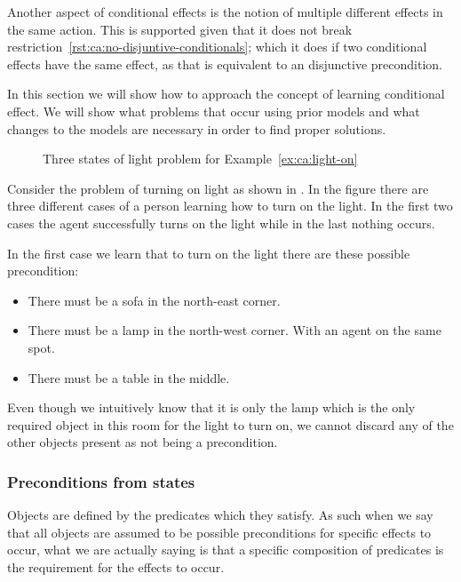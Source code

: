 \documentclass[../Master.tex]{subfiles}
\providecommand{\master}{..}
\begin{document}
Another aspect of conditional effects is the notion of multiple different effects in the same action. This is supported given that it does not break restriction~\ref{rst:ca:no-disjuntive-conditionals}; which it does if two conditional effects have the same effect, as that is equivalent to an disjunctive precondition.

In this section we will show how to approach the concept of learning conditional effect. We will show what problems that occur using prior models and what changes to the models are necessary in order to find proper solutions.

\begin{figure}
	\caption{\label{fig:ca:house-example}Three states of light problem for Example~\ref{ex:ca:light-on}}
\end{figure}

\begin{example}\label{ex:ca:light-on}
Consider the problem of turning on light as shown in .
In the figure there are three different cases of a person learning how to turn on the
light. In the first two cases the agent successfully turns on the light while in the last nothing occurs.

In the first case we learn that to turn on the light there are these possible precondition:
\begin{itemize}
	\item There must be a sofa in the north-east corner.
	\item There must be a lamp in the north-west corner. With an agent on the same spot.
	\item There must be a table in the middle.
\end{itemize}
Even though we intuitively know that it is only the lamp which is the only required object in this room for the light to turn on, we cannot discard any of the other objects present as not being a precondition.
\end{example}

\subsubsection{Preconditions from states}
Objects are defined by the predicates which they satisfy. As such when we say that all objects are assumed to be possible preconditions for specific effects to occur, what we are actually saying is that a specific composition of predicates is the requirement for the effects to occur.
\end{document}

